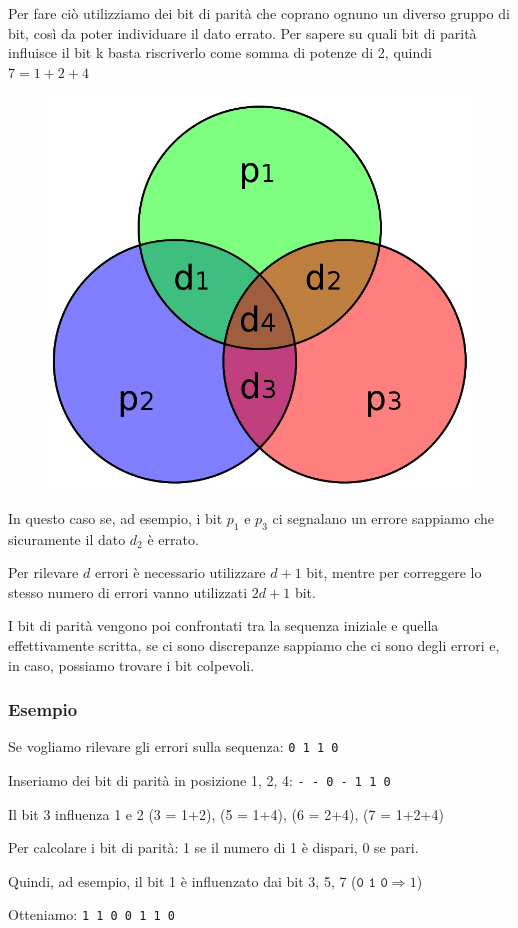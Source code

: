 Per fare ciò utilizziamo dei bit di parità che coprano ognuno un diverso gruppo di bit, così da poter individuare il dato errato.
Per sapere su quali bit di parità influisce il bit k basta riscriverlo come somma di potenze di 2, quindi $7 = 1 + 2 + 4$

\begin{figure}[H]
    \centering
    \includegraphics[width=0.35\linewidth]{assets/hamming-diagram.jpeg}
\end{figure}

In questo caso se, ad esempio, i bit $p_1$ e $p_3$ ci segnalano un errore sappiamo che sicuramente il dato $d_2$ è errato.

\spacer
Per rilevare $d$ errori è necessario utilizzare $d+1$ bit, mentre per correggere lo stesso numero di errori vanno utilizzati $2d+1$ bit.

I bit di parità vengono poi confrontati tra la sequenza iniziale e quella effettivamente scritta, se ci sono discrepanze sappiamo che ci sono degli errori e, in caso, possiamo trovare i bit colpevoli.


\subsubsection*{Esempio}
Se vogliamo rilevare gli errori sulla sequenza: \texttt{0 1 1 0}

\spacer
Inseriamo dei bit di parità in posizione 1, 2, 4: \texttt{- - 0 - 1 1 0}

Il bit 3 influenza 1 e 2 (3 = 1+2), (5 = 1+4), (6 = 2+4), (7 = 1+2+4)

\spacer
Per calcolare i bit di parità: 1 se il numero di 1 è dispari, 0 se pari.

Quindi, ad esempio, il bit 1 è influenzato dai bit 3, 5, 7 ($\texttt{0 1 0} \Rightarrow 1$)

Otteniamo: \texttt{1 1 0 0 1 1 0}
